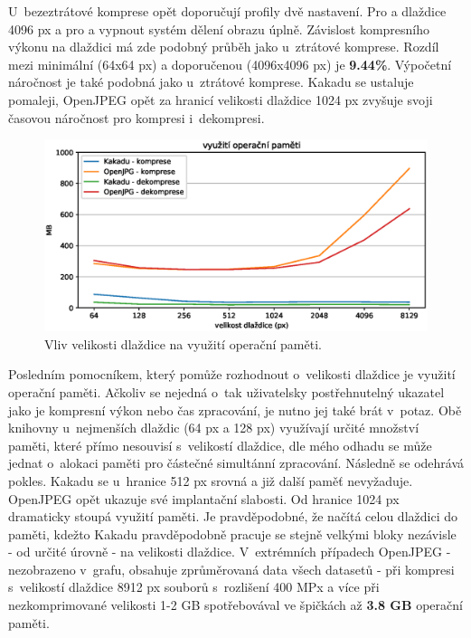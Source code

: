 \clearpage
\noindent U~bezeztrátové komprese opět doporučují profily dvě nastavení. Pro  a  dlaždice 4096 px a pro  a  vypnout systém dělení obrazu úplně. Závislost kompresního výkonu na dlaždici má zde podobný průběh jako u~ztrátové komprese. Rozdíl mezi minimální (64x64 px) a doporučenou (4096x4096 px) je \textbf{9.44\%}. Výpočetní náročnost je také podobná jako u~ztrátové komprese. Kakadu se ustaluje pomaleji, OpenJPEG opět za hranicí velikosti dlaždice 1024 px zvyšuje svoji časovou náročnost pro kompresi i~dekompresi.

\begin{figure}[hbt!]
  \centering
  \hspace*{-0.75cm}
  \includegraphics[width=16cm]{obrazky-figures/ram.eps}
  \caption{Vliv velikosti dlaždice na využití operační paměti.}
\end{figure}
\noindent Posledním pomocníkem, který pomůže rozhodnout o~velikosti dlaždice je využití operační paměti. Ačkoliv se nejedná o~tak uživatelsky postřehnutelný ukazatel jako je kompresní výkon nebo čas zpracování, je nutno jej také brát v~potaz.
Obě knihovny u~nejmenších dlaždic (64 px a 128 px) využívají určité množství paměti, které přímo nesouvisí s~velikostí dlaždice, dle mého odhadu se může jednat o~alokaci paměti pro částečné simultánní zpracování. Následně se odehrává pokles. Kakadu se u~hranice 512 px srovná a již další paměť nevyžaduje. OpenJPEG opět ukazuje své implantační slabosti. Od hranice 1024 px dramaticky stoupá využití paměti. Je pravděpodobné, že načítá celou dlaždici do paměti, kdežto Kakadu pravděpodobně pracuje se stejně velkými bloky nezávisle - od určité úrovně - na velikosti dlaždice. V~extrémních případech OpenJPEG - nezobrazeno v~grafu, obsahuje zprůměrovaná data všech datasetů - při kompresi s~velikostí dlaždice 8912 px souborů s~rozlišení 400 MPx a více při nezkomprimované velikosti 1-2 GB spotřebovával ve špičkách až \textbf{3.8 GB} operační paměti.\\
